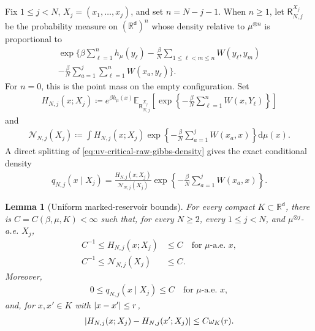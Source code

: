 \documentclass[11pt,reqno]{amsart}
\numberwithin{equation}{section}
\theoremstyle{plain}
\newtheorem{lemma}[lemma]{Lemma}
\theoremstyle{remark}
\DeclarePairedDelimiter{\abs}{\lvert}{\rvert}
\renewcommand{\d}{\mathsf{d}}
\newcommand{\md}{\mathrm{d}}
\newcommand{\R}{{\mathbb{R}}}
\newcommand{\E}{{\mathbb{E}}}
\newcommand{\be}{\beta}
\begin{document}
Fix \(1\le j<N\), \(X_j=(x_1,\ldots,x_j)\), and set \(n=N-j-1\).  When \(n\ge1\), let \(\mathsf R_{N,j}^{X_j}\) be the probability measure on \((\R^\d)^n\) whose density relative to \(\mu^{\otimes n}\) is proportional to
\begin{multline}\label{eq:uv-critical-marked-reservoir-law}
 \exp\Bigg\{
 \be\sum_{\ell=1}^nh_\mu(y_\ell)
 -\frac\be N\sum_{1\le\ell<m\le n}W(y_\ell,y_m)\\
 -\frac\be N\sum_{a=1}^j\sum_{\ell=1}^nW(x_a,y_\ell)
 \Bigg\}.
\end{multline}
For \(n=0\), this is the point mass on the empty configuration.  Set
\begin{align}\label{eq:uv-critical-marked-H-def}
 H_{N,j}(x;X_j)
 \coloneqq
 e^{\be h_\mu(x)}
 \E_{\mathsf R_{N,j}^{X_j}}\left[
 \exp\left\{-\frac\be N\sum_{\ell=1}^nW(x,Y_\ell)\right\}
 \right]
\end{align}
and
\begin{align}\label{eq:uv-critical-marked-normalization-def}
 \mathcal N_{N,j}(X_j)
 \coloneqq
 \int H_{N,j}(x;X_j)
 \exp\left\{-\frac\be N\sum_{a=1}^jW(x_a,x)\right\}\md\mu(x).
\end{align}
A direct splitting of \eqref{eq:uv-critical-raw-gibbs-density} gives the exact conditional density
\begin{align}\label{eq:uv-critical-marked-conditional-factorization}
 q_{N,j}(x\mid X_j)
 =\frac{H_{N,j}(x;X_j)}{\mathcal N_{N,j}(X_j)}
 \exp\left\{-\frac\be N\sum_{a=1}^jW(x_a,x)\right\}.
\end{align}

\begin{lemma}[Uniform marked-reservoir bounds]
\label{lem:uv-critical-marked-reservoir}
For every compact \(K\subset\R^\d\), there is \(C=C(\be,\mu,K)<\infty\) such that, for every \(N\ge2\), every \(1\le j<N\), and \(\mu^{\otimes j}\)-a.e. \(X_j\),
\begin{align}
 C^{-1}\le H_{N,j}(x;X_j)&\le C
 \quad\text{for \(\mu\)-a.e. \(x\)},
 \label{eq:uv-critical-H-uniform-bound}\\
 C^{-1}\le \mathcal N_{N,j}(X_j)&\le C.
 \label{eq:uv-critical-normalization-uniform-bound}
\end{align}
Moreover,
\begin{align}\label{eq:uv-critical-conditional-uniform-upper}
 0\le q_{N,j}(x\mid X_j)\le C
 \quad\text{for \(\mu\)-a.e. \(x\)},
\end{align}
and, for \(x,x'\in K\) with \(\abs{x-x'}\le r\),
\begin{align}\label{eq:uv-critical-H-modulus}
 \abs{H_{N,j}(x;X_j)-H_{N,j}(x';X_j)}
 \le C\omega_K(r).
\end{align}
\end{lemma}
\end{document}

